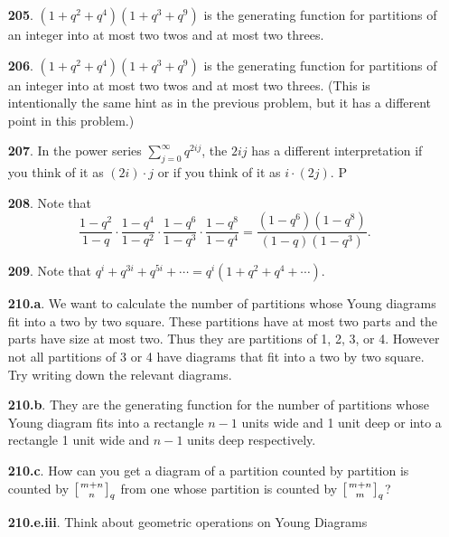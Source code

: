 \documentclass[10pt,]{book}
\theoremstyle{plain}
\theoremstyle{definition}
\theoremstyle{definition}
\numberwithin{equation}{chapter}
\newcommand{\qchoose}[2]{\left[{#1\atop#2}\right]_q}
\begin{document}
\begin{itemize}[itemsep=1em]
\item[\textbf{205}.]\((1 + q^2 + q^4 )(1 + q^3 + q^9 )\) is the generating function for partitions of an integer into at most two twos and at most two threes.%

\item[\textbf{206}.]\((1 + q^2 + q^4 )(1 + q^3 + q^9 )\) is the generating function for partitions of an integer into at most two twos and at most two threes. (This is intentionally the same hint as in the previous problem, but it has a different point in this problem.)%

\item[\textbf{207}.]In the power series \(\sum_{j=0}^\infty q^{2ij}\), the \(2ij\) has a different interpretation if you think of it as \((2i) \cdot j\) or if you think of it as \(i \cdot (2j)\). P%

\item[\textbf{208}.]Note that%
\begin{equation*}
\frac{1-q^2}{1-q}\cdot \frac{1-q^4}{1-q^2}\cdot \frac{1-q^6}{1-q^3}\cdot \frac{1-q^8}{1-q^4} = \frac{(1-q^6)(1-q^8)}{(1-q)(1-q^3)} \text{.}
\end{equation*}
%

\item[\textbf{209}.]Note that \(q^i + q^{3i} + q^{5i} + \cdots = q^i (1 + q^2 + q^4 + \cdots)\).%

\item[\textbf{210.a}.]We want to calculate the number of partitions whose Young diagrams fit into a two by two square. These partitions have at most two parts and the parts have size at most two. Thus they are partitions of 1, 2, 3, or 4. However not all partitions of 3 or 4 have diagrams that fit into a two by two square. Try writing down the relevant diagrams.%

\item[\textbf{210.b}.]They are the generating function for the number of partitions whose Young diagram fits into a rectangle \(n - 1\) units wide and 1 unit deep or into a rectangle 1 unit wide and \(n - 1\) units deep respectively.%

\item[\textbf{210.c}.]How can you get a diagram of a partition counted by partition is counted by \(\qchoose{m+n}{n}\) from one whose partition is counted by \(\qchoose{m+n}{m}\)?%

\item[\textbf{210.e.iii}.]Think about geometric operations on Young Diagrams%


\end{itemize}
\end{document}
